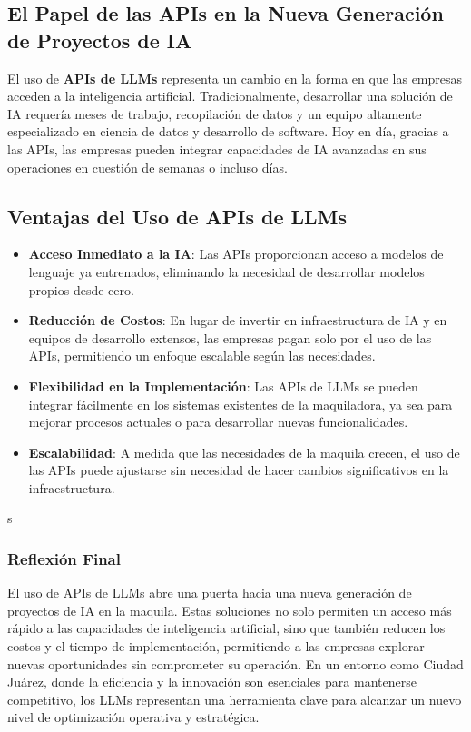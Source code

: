 \subsection{El Papel de las APIs en la Nueva Generación de Proyectos de IA}

El uso de \textbf{APIs de LLMs} representa un cambio en la forma en que las empresas acceden a la inteligencia artificial. Tradicionalmente, desarrollar una solución de IA requería meses de trabajo, recopilación de datos y un equipo altamente especializado en ciencia de datos y desarrollo de software. Hoy en día, gracias a las APIs, las empresas pueden integrar capacidades de IA avanzadas en sus operaciones en cuestión de semanas o incluso días. 

\subsection{Ventajas del Uso de APIs de LLMs}
\begin{itemize}
    \item \textbf{Acceso Inmediato a la IA}: Las APIs proporcionan acceso a modelos de lenguaje ya entrenados, eliminando la necesidad de desarrollar modelos propios desde cero.
    \item \textbf{Reducción de Costos}: En lugar de invertir en infraestructura de IA y en equipos de desarrollo extensos, las empresas pagan solo por el uso de las APIs, permitiendo un enfoque escalable según las necesidades.
    \item \textbf{Flexibilidad en la Implementación}: Las APIs de LLMs se pueden integrar fácilmente en los sistemas existentes de la maquiladora, ya sea para mejorar procesos actuales o para desarrollar nuevas funcionalidades.
    \item \textbf{Escalabilidad}: A medida que las necesidades de la maquila crecen, el uso de las APIs puede ajustarse sin necesidad de hacer cambios significativos en la infraestructura.
\end{itemize}s


\subsubsection{Reflexión Final}

El uso de APIs de LLMs abre una puerta hacia una nueva generación de proyectos de IA en la maquila. Estas soluciones no solo permiten un acceso más rápido a las capacidades de inteligencia artificial, sino que también reducen los costos y el tiempo de implementación, permitiendo a las empresas explorar nuevas oportunidades sin comprometer su operación. En un entorno como Ciudad Juárez, donde la eficiencia y la innovación son esenciales para mantenerse competitivo, los LLMs representan una herramienta clave para alcanzar un nuevo nivel de optimización operativa y estratégica. 

